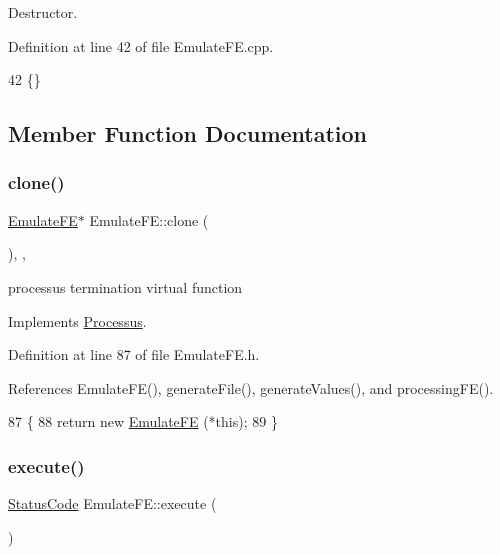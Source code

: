 Destructor. 



Definition at line 42 of file Emulate\+F\+E.\+cpp.


\begin{DoxyCode}
42 \{\}
\end{DoxyCode}


\subsection{Member Function Documentation}
\mbox{\label{classEmulateFE_a9a704d0081a275410d19071a006f1a80}} 
\subsubsection{\texorpdfstring{clone()}{clone()}}
{\footnotesize\ttfamily \hyperlink{classEmulateFE_1_1EmulateFE}{Emulate\+FE}$\ast$ Emulate\+F\+E\+::clone (\begin{DoxyParamCaption}{ }\end{DoxyParamCaption})\hspace{0.3cm}{\ttfamily [inline]}, {\ttfamily [protected]}, {\ttfamily [virtual]}}

processus termination virtual function 

Implements \hyperlink{classProcessus_aca8856f6d6d7b7e1fe941f298dcbb502}{Processus}.



Definition at line 87 of file Emulate\+F\+E.\+h.



References Emulate\+F\+E(), generate\+File(), generate\+Values(), and processing\+F\+E().


\begin{DoxyCode}
87                     \{
88     \textcolor{keywordflow}{return} \textcolor{keyword}{new} \hyperlink{classEmulateFE_ac6242fca0d5c30477153d1d33d5f990d}{EmulateFE} (*\textcolor{keyword}{this});
89   \}
\end{DoxyCode}
\mbox{\label{classEmulateFE_a5133d5b45521fc311db62d61217848b9}} 
\subsubsection{\texorpdfstring{execute()}{execute()}}
{\footnotesize\ttfamily \hyperlink{classStatusCode}{Status\+Code} Emulate\+F\+E\+::execute (\begin{DoxyParamCaption}{ }\end{DoxyParamCaption})\hspace{0.3cm}{\ttfamily [virtual]}}

